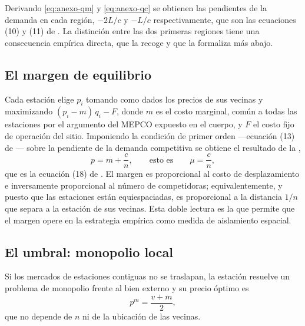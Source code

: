 Derivando \eqref{eq:anexo-qm} y \eqref{eq:anexo-qc} se obtienen las pendientes de
la demanda en cada región, $-2L/c$ y $-L/c$ respectivamente, que son las
ecuaciones (10) y (11) de \textcite[144]{SALOP1979}. La distinción entre las dos
primeras regiones tiene una consecuencia empírica directa, que la
 recoge y que la  formaliza más abajo.

\subsection{El margen de equilibrio}

Cada estación elige $p_i$ tomando como dados los precios de sus vecinas y
maximizando $(p_i - m)\,q_i - F$, donde $m$ es el costo marginal, común a todas
las estaciones por el argumento del MEPCO expuesto en el cuerpo, y $F$ el costo
fijo de operación del sitio. Imponiendo la condición de primer orden —ecuación
(13) de \textcite[147]{SALOP1979}— sobre la pendiente de la demanda competitiva
se obtiene el resultado de la ,
\begin{equation}
    p = m + \frac{c}{n} ,
    \qquad\text{esto es}\qquad
    \mu = \frac{c}{n} ,
    \label{eq:anexo-margen}
\end{equation}
que es la ecuación (18) de \textcite[147]{SALOP1979}. El margen es proporcional
al costo de desplazamiento e inversamente proporcional al número de competidoras;
equivalentemente, y puesto que las estaciones están equiespaciadas, es
proporcional a la distancia $1/n$ que separa a la estación de sus vecinas. Esta
doble lectura es la que permite que el margen opere en la estrategia empírica
como medida de aislamiento espacial.

\subsection{El umbral: monopolio local}

\begin{proposicion}
\label{prop:monopolio}
Si los mercados de estaciones contiguas no se traslapan, la estación resuelve un
problema de monopolio frente al bien externo y su precio óptimo es
\begin{equation}
    p^{m} = \frac{v + m}{2} ,
    \label{eq:monopolio}
\end{equation}
que no depende de $n$ ni de la ubicación de las vecinas.
\end{proposicion}

